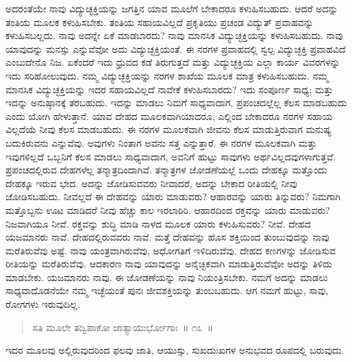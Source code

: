 ಅದರಂತೆಯೇ ನಾವು ವಿದ್ಯುಚ್ಛಕ್ತಿಯನ್ನು ಜಗತ್ತಿನ ಯಾವ ಮೂಲೆಗೆ ಬೇಕಾದರೂ ಕಳುಹಿಸಬಹುದು. ಆದರೆ ಅದನ್ನು ತಂತಿಯ ಮೂಲಕ ಕಳುಹಿಸಬೇಕು. ತಂತಿಯ ಸಹಾಯವಿಲ್ಲದೆ ಪ್ರಕೃತಿಯು ಪ್ರಚಂಡ ವಿದ್ಯುತ್​ ಪ್ರವಾಹವನ್ನು ಕಳುಹಿಸಬಲ್ಲದು. ನಾವು ಅದನ್ನೇ ಏಕೆ ಮಾಡಬಾರದು? ನಾವು ಮಾನಸಿಕ ವಿದ್ಯುಚ್ಛಕ್ತಿಯನ್ನು ಕಳುಹಿಸಬಹುದು. ನಾವು ಯಾವುದನ್ನು ಮನಸ್ಸು ಎನ್ನುವೆವೋ ಅದು ವಿದ್ಯುಚ್ಛಕ್ತಿಯಂತೆ. ಈ ನರಗಳ ಪ್ರವಾಹದಲ್ಲಿ ಸ್ವಲ್ಪ ವಿದ್ಯುಚ್ಛಕ್ತಿ ಪ್ರವಾಹವಿದೆ ಎಂಬುದೇನೊ ನಿಜ. ಏಕೆಂದರೆ ಇದು ಧ್ರುವದ ಕಡೆ ತಿರುಗುತ್ತದೆ ಮತ್ತು ವಿದ್ಯುಚ್ಛಕ್ತಿಯ ಎಲ್ಲಾ ಕಾರ್ಯ ವಿವರಗಳನ್ನು ಇದು ಸರಿಹೋಲುವುದು. ನಮ್ಮ ವಿದ್ಯುಚ್ಛಕ್ತಿಯನ್ನು ನರಗಳ ಶಾಖೆಯ ಮೂಲಕ ಮಾತ್ರ ಕಳುಹಿಸಬಹುದು. ನಮ್ಮ ಮಾನಸಿಕ ವಿದ್ಯುಚ್ಛಕ್ತಿಯನ್ನು ಇದರ ಸಹಾಯವಿಲ್ಲದೆ ನಾವೇಕೆ ಕಳುಹಿಸಬಾರದು? ಇದು ಸಂಪೂರ್ಣ ಸಾಧ್ಯ; ಮತ್ತು ಇದನ್ನು ಅನುಷ್ಠಾನಕ್ಕೆ ತರಬಹುದು. ಇದನ್ನು ಮಾಡಲು ನಿಮಗೆ ಸಾಧ್ಯವಾದಾಗ, ಪ್ರಪಂಚದಲ್ಲೆಲ್ಲ ಕೆಲಸ ಮಾಡಬಹುದು ಎಂದು ಯೋಗಿ ಹೇಳುತ್ತಾನೆ. ಯಾವ ದೇಹದ ಮೂಲಕವಾಗಿಯಾದರೂ, ಎಲ್ಲಿಂದ ಬೇಕಾದರೂ ನರಗಳ ಸಹಾಯ ವಿಲ್ಲದೆಯೆ ನೀವು ಕೆಲಸ ಮಾಡಬಹುದು. ಈ ನರಗಳ ಮೂಲಕವಾಗಿ ಜೀವನು ಕೆಲಸ ಮಾಡುತ್ತಿರುವಾಗ ಮನುಷ್ಯ ಬದುಕಿರುವನು ಎನ್ನುವೆವು. ಅವುಗಳು ನಿಂತಾಗ ಅವನು ಸತ್ತ ಎನ್ನುತ್ತಾರೆ. ಈ ನರಗಳ ಮೂಲಕವಾಗಿ ಮತ್ತು ಇವುಗಳಿಲ್ಲದೆ ಒಬ್ಬನಿಗೆ ಕೆಲಸ ಮಾಡಲು ಸಾಧ್ಯವಾದಾಗ, ಅವನಿಗೆ ಹುಟ್ಟು ಸಾವುಗಳು ಅರ್ಥವಿಲ್ಲದವುಗಳಾಗುತ್ತವೆ. ಪ್ರಪಂಚದಲ್ಲಿರುವ ದೇಹಗಳೆಲ್ಲ ತನ್ಮಾತ್ರದಿಂದಾಗಿವೆ. ತನ್ಮಾತ್ರಗಳ ಜೋಡಣೆಯಲ್ಲೆ ಒಂದು ದೇಹಕ್ಕೂ ಮತ್ತೊಂದು ದೇಹಕ್ಕೂ ಇರುವ ಭೇದ. ಅದನ್ನು ಜೋಡಿಸುವವರು ನೀವಾದರೆ, ಅದನ್ನು ಬೇಕಾದ ರೀತಿಯಲ್ಲಿ ನೀವು ಜೋಡಿಸಬಹುದು. ನೀವಲ್ಲದೆ ಈ ದೇಹವನ್ನು ಯಾರು ಮಾಡುವರು? ಆಹಾರವನ್ನು ಯಾರು ತಿನ್ನುವರು? ನಿಮಗಾಗಿ ಮತ್ತೊಬ್ಬನು ಊಟ ಮಾಡಿದರೆ ನೀವು ಹೆಚ್ಚು ಕಾಲ ಇರಲಾರಿರಿ. ಆಹಾರದಿಂದ ರಕ್ತವನ್ನು ಯಾರು ಮಾಡುವರು? ನಿಜವಾಗಿಯೂ ನೀವೆ. ರಕ್ತವನ್ನು ಶುದ್ಧಿ ಮಾಡಿ ನಾಳದ ಮೂಲಕ ಯಾರು ಕಳುಹಿಸುವರು? ನೀವೆ. ದೇಹದ ಯಜಮಾನರು ನಾವೆ. ದೇಹದಲ್ಲಿರುವವರು ನಾವೆ. ಮತ್ತೆ ದೇಹವನ್ನು ಹೊಸ ಶಕ್ತಿಯಿಂದ ತುಂಬುವುದನ್ನು ನಾವು ಮರೆತಿರುವೆವು ಅಷ್ಟೆ. ನಾವು ಯಂತ್ರವಾಗಿರುವೆವು, ಅಧೋಗತಿಗೆ ಇಳಿದಿರುವೆವು. ದೇಹದ ಕಣಗಳನ್ನು ಜೋಡಿಸುವ ರೀತಿಯನ್ನು ಮರೆತಿರುವೆವು. ಆದಕಾರಣ ನಾವು ಯಾವುದನ್ನು ಅನೈಚ್ಛಿಕವಾಗಿ ಮಾಡುತ್ತಿರುವೆವೋ ಅದನ್ನು ತಿಳಿದು ಮಾಡಬೇಕು. ಯಜಮಾನರು ನಾವು. ಈ ಜೋಡಣೆಯನ್ನು ನಾವು ನಿಯಂತ್ರಿಸಬೇಕು. ನಮಗೆ ಅದನ್ನು ಮಾಡಲು ಸಾಧ್ಯವಾದೊಡನೆಯೇ ನಮ್ಮ ಇಚ್ಛೆಯಂತೆ ಪುನಃ ಜೀವಶಕ್ತಿಯನ್ನು ತುಂಬಬಹುದು. ಆಗ ನಮಗೆ ಹುಟ್ಟು, ಸಾವು, ರೋಗಗಳು ಇರುವುದಿಲ್ಲ. 


\begin{verse}
ಸತಿ ಮೂಲೇ ತದ್ವಿಪಾಕೋ ಜಾತ್ಯಾಯುರ್ಭೋಗಾಃ~॥ ೧೩~॥
\end{verse}


ಇದರ ಮೂಲವು ಅಲ್ಲಿರುವುದರಿಂದ ಫಲವು ಜಾತಿ, ಆಯುಸ್ಸು, ಸುಖದುಃಖಗಳ ಅನುಭವದ ರೂಪದಲ್ಲಿ ಬರುವುದು. 

